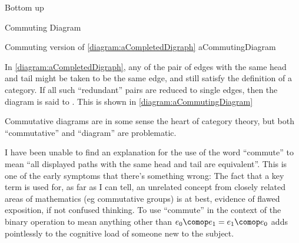 \begin{plSection}{Bottom up}
\begin{plSection}{Commuting Diagram}
\begin{plDiagram}
{Commuting version of \cref{diagram:aCompletedDigraph}}
{aCommutingDiagram}
\centering
{}
\end{plDiagram}

In \cref{diagram:aCompletedDigraph}, 
any of the pair of edges with the same head and tail might be
taken to be the same edge, and still satisfy the definition of a
category. 
If all such ``redundant'' pairs are reduced to single edges,
then the diagram is said to .
This is shown in \cref{diagram:aCommutingDiagram}

Commutative diagrams are in some sense the heart of category
theory,
but both ``commutative'' and ``diagram'' are problematic.

I have been unable to find an explanation for the use of
the word ``commute'' to mean ``all displayed paths
with the same head and tail are equivalent''.
This is one of the early symptoms that there's something wrong:
The fact that a key term is used for, as far as I can tell, 
an unrelated concept
from closely related areas of mathematics (eg commutative groups)
is at best, evidence of flawed exposition, if not confused thinking.
To use ``commute'' in the context of the binary \compose
operation to mean anything other than $e_0 \comop e_1 = e_1 \comop e_0$
adds pointlessly to the cognitive load of someone new to the subject.


\end{plSection}
\end{plSection}
